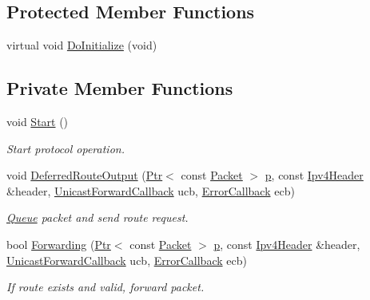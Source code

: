 \subsection*{Protected Member Functions}
\begin{DoxyCompactItemize}
\item 
virtual void \hyperlink{classns3_1_1aodv_1_1RoutingProtocol_ae42c9385e8ede77f42fdb575e26ef880}{Do\+Initialize} (void)
\end{DoxyCompactItemize}
\subsection*{Private Member Functions}
\begin{DoxyCompactItemize}
\item 
void \hyperlink{classns3_1_1aodv_1_1RoutingProtocol_a93dd1a9a127ebea592e06e3cf3f5cb11}{Start} ()
\begin{DoxyCompactList}\small\item\em Start protocol operation. \end{DoxyCompactList}\item 
void \hyperlink{classns3_1_1aodv_1_1RoutingProtocol_a3e53873fd2f4dad41aeba24b9a16ce48}{Deferred\+Route\+Output} (\hyperlink{classns3_1_1Ptr}{Ptr}$<$ const \hyperlink{classns3_1_1Packet}{Packet} $>$ \hyperlink{lte__link__budget__x2__handover__measures_8m_ac9de518908a968428863f829398a4e62}{p}, const \hyperlink{classns3_1_1Ipv4Header}{Ipv4\+Header} \&header, \hyperlink{classns3_1_1Ipv4RoutingProtocol_a3453a85764cbbb1e704da7e919aa5d19}{Unicast\+Forward\+Callback} ucb, \hyperlink{classns3_1_1Ipv4RoutingProtocol_a0348285418c30d5021b08f7a68af21ea}{Error\+Callback} ecb)
\begin{DoxyCompactList}\small\item\em \hyperlink{classns3_1_1Queue}{Queue} packet and send route request. \end{DoxyCompactList}\item 
bool \hyperlink{classns3_1_1aodv_1_1RoutingProtocol_ac2a8a2aa27dacd9fec657bcb3495bed3}{Forwarding} (\hyperlink{classns3_1_1Ptr}{Ptr}$<$ const \hyperlink{classns3_1_1Packet}{Packet} $>$ \hyperlink{lte__link__budget__x2__handover__measures_8m_ac9de518908a968428863f829398a4e62}{p}, const \hyperlink{classns3_1_1Ipv4Header}{Ipv4\+Header} \&header, \hyperlink{classns3_1_1Ipv4RoutingProtocol_a3453a85764cbbb1e704da7e919aa5d19}{Unicast\+Forward\+Callback} ucb, \hyperlink{classns3_1_1Ipv4RoutingProtocol_a0348285418c30d5021b08f7a68af21ea}{Error\+Callback} ecb)
\begin{DoxyCompactList}\small\item\em If route exists and valid, forward packet. \end{DoxyCompactList}\item 

\end{DoxyCompactItemize}
